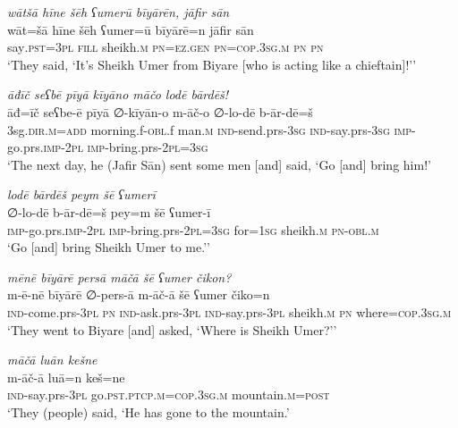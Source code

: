\ea \label{ŠJ.15}
\textit{wātšā hīne šēh ʕumerū bīyārēn, jāfir sān} \\ 
\gll wāt=šā hīne šēh ʕumer=ū bīyārē=n jāfir sān \\ 
 say\textsc{.pst}\textsc{=3pl} \textsc{fill} sheikh\textsc{.m} \textsc{pn}\textsc{=ez.gen} \textsc{pn}\textsc{=cop}\textsc{.3sg}\textsc{.m} \textsc{pn} \textsc{pn} \\ 
\glt `They said, ‘It’s Sheikh Umer from Biyare [who is acting like a chieftain]!’'
\z 
 
\ea \label{ŠJ.20}
\textit{āđīč seʕbē pīyā kīyāno māčo lodē bārdēš!} \\ 
\gll āđ=īč seʕbe-ē pīyā ∅-kīyān-o m-āč-o ∅-lo-dē b-ār-dē=š \\ 
 3sg\textsc{.dir}\textsc{.m}\textsc{=add} morning.f\textsc{-obl}.f man\textsc{.m} \textsc{ind-}send.prs\textsc{-3sg} \textsc{ind-}say.prs\textsc{-3sg} \textsc{imp-}go.prs.\textsc{imp-}\textsc{2pl} \textsc{imp-}bring.prs-\textsc{2pl}\textsc{=3sg} \\ 
\glt `The next day, he (Jafir Sān) sent some men [and] said, ‘Go [and] bring him!'
\z 
 
\ea \label{ŠJ.21}
\textit{lodē bārdēš peym šē ʕumerī} \\ 
\gll ∅-lo-dē b-ār-dē=š pey=m šē ʕumer-ī \\ 
 \textsc{imp-}go.prs.\textsc{imp-}\textsc{2pl} \textsc{imp-}bring.prs-\textsc{2pl}\textsc{=3sg} for\textsc{=\textsc{1sg}} sheikh\textsc{.m} \textsc{pn}\textsc{-obl}\textsc{.m} \\ 
\glt `Go [and] bring Sheikh Umer to me.’'
\z 
 
\ea \label{ŠJ.22}
\textit{mēnē bīyārē persā māčā šē ʕumer čikon?} \\ 
\gll m-ē-nē bīyārē ∅-pers-ā m-āč-ā šē ʕumer čiko=n \\ 
 \textsc{ind-}come.prs\textsc{-3pl} \textsc{pn} \textsc{ind-}ask.prs\textsc{-3pl} \textsc{ind-}say.prs\textsc{-3pl} sheikh\textsc{.m} \textsc{pn} where\textsc{=cop}\textsc{.3sg}\textsc{.m} \\ 
\glt `They went to Biyare [and] asked, ‘Where is Sheikh Umer?’'
\z 
 
\ea \label{ŠJ.23}
\textit{māčā luān kešne} \\ 
\gll m-āč-ā luā=n keš=ne \\ 
 \textsc{ind-}say.prs\textsc{-3pl} go\textsc{.pst}\textsc{.ptcp}\textsc{.m}\textsc{=cop}\textsc{.3sg}\textsc{.m} mountain\textsc{.m}\textsc{=\textsc{post}} \\ 
\glt `They (people) said, ‘He has gone to the mountain.'
\z 
 
